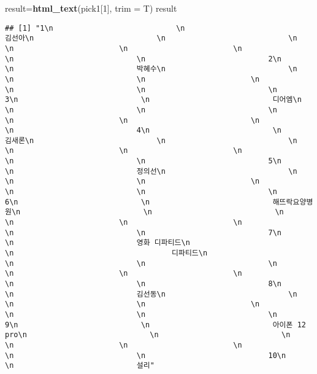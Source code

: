 \documentclass[
]{article}
\newenvironment{Shaded}{\begin{snugshade}}{\end{snugshade}}
\newcommand{\DataTypeTok}[1]{\textcolor[rgb]{0.13,0.29,0.53}{#1}}
\newcommand{\DecValTok}[1]{\textcolor[rgb]{0.00,0.00,0.81}{#1}}
\newcommand{\KeywordTok}[1]{\textcolor[rgb]{0.13,0.29,0.53}{\textbf{#1}}}
\newcommand{\NormalTok}[1]{#1}
\begin{document}
\begin{Shaded}
\begin{Highlighting}[]
\NormalTok{result=}\KeywordTok{html_text}\NormalTok{(pick1[}\DecValTok{1}\NormalTok{], }\DataTypeTok{trim =}\NormalTok{ T)}
\NormalTok{result}
\end{Highlighting}
\end{Shaded}

\begin{verbatim}
## [1] "1\n                            \n                            김선아\n                            \n                            \n                            \n                        \n                        \n                            \n                            \n                            2\n                            \n                            박혜수\n                            \n                            \n                            \n                        \n                        \n                            \n                            \n                            3\n                            \n                            디어엠\n                            \n                            \n                            \n                        \n                        \n                            \n                            \n                            4\n                            \n                            김새론\n                            \n                            \n                            \n                        \n                        \n                            \n                            \n                            5\n                            \n                            정의선\n                            \n                            \n                            \n                        \n                        \n                            \n                            \n                            6\n                            \n                            해뜨락요양병원\n                            \n                            \n                            \n                        \n                        \n                            \n                            \n                            7\n                            \n                            영화 디파티드\n                                \n                                    디파티드\n                                \n                            \n                            \n                            \n                        \n                        \n                            \n                            \n                            8\n                            \n                            김선동\n                            \n                            \n                            \n                        \n                        \n                            \n                            \n                            9\n                            \n                            아이폰 12 pro\n                            \n                            \n                            \n                        \n                        \n                            \n                            \n                            10\n                            \n                            설리"

\end{verbatim}
\end{document}
